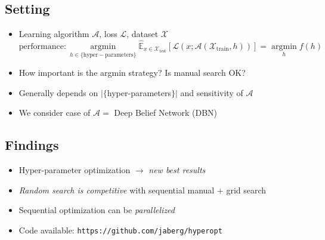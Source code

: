 \documentclass[12pt]{scrartcl}
\newcommand{\un}[1]{\emph{#1}}
\begin{document}
\twocoltext


\color{black} %
\begin{shaded}
\begin{minipage}{.9\linewidth}
\color{black}

\subsection{Setting}

\begin{itemize}
    \setlength{\itemsep}{2pt}
    \setlength{\parsep}{0pt}
\item Learning algorithm $\mathcal{A}$, loss $\mathcal{L}$, dataset
$\mathcal{X}$  \\
\begin{equation*}
\text{performance}:
\operatorname*{argmin}_{h \in \{\mathrm{hyper-parameters} \}}
\mathbb{\hat E}_{x \in \mathcal{X}_{\mathrm{test}}}\left[ \mathcal{L}\left(x;
\mathcal{A}(\mathcal{X}_{\mathrm{train}}, h) \right) \right]
= 
\operatorname*{argmin}_{h }
f(h)
\end{equation*}
    \item How important is the argmin strategy? Is manual search OK?
    \item Generally depends on $|\{$hyper-parameters$\}|$ and sensitivity of
    $\mathcal{A}$
    \item We consider case of $\mathcal{A} =$ Deep Belief Network (DBN) 
\end{itemize}


\subsection{Findings}

\begin{itemize}
    \setlength{\itemsep}{2pt}
    \setlength{\parsep}{0pt}
    \item Hyper-parameter optimization $\rightarrow$ \un{new best results}
    \item \un{Random search is competitive} with sequential manual + grid search
    \item Sequential optimization can be \un{parallelized}
    \item Code available: \texttt{https://github.com/jaberg/hyperopt}
\end{itemize}

\end{minipage}
\end{shaded}
\color{black}
\end{document}
